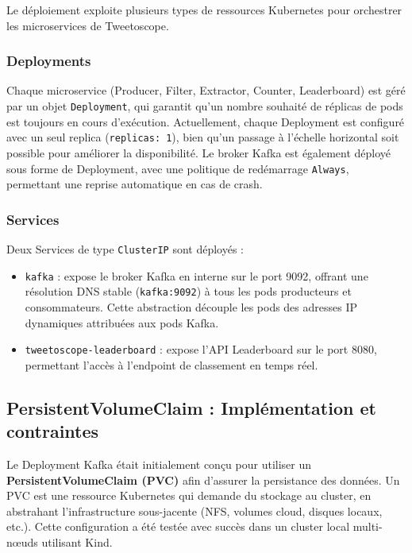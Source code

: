 \documentclass[10pt,a4paper]{article}
\begin{document}
Le déploiement exploite plusieurs types de ressources Kubernetes pour orchestrer les microservices de Tweetoscope.

\subsubsection{Deployments}

Chaque microservice (Producer, Filter, Extractor, Counter, Leaderboard) est géré par un objet \texttt{Deployment}, qui garantit qu’un nombre souhaité de réplicas de pods est toujours en cours d’exécution. Actuellement, chaque Deployment est configuré avec un seul replica (\texttt{replicas: 1}), bien qu’un passage à l’échelle horizontal soit possible pour améliorer la disponibilité. Le broker Kafka est également déployé sous forme de Deployment, avec une politique de redémarrage \texttt{Always}, permettant une reprise automatique en cas de crash.

\subsubsection{Services}

Deux Services de type \texttt{ClusterIP} sont déployés :

\begin{itemize}
    \item \texttt{kafka} : expose le broker Kafka en interne sur le port 9092, offrant une résolution DNS stable (\texttt{kafka:9092}) à tous les pods producteurs et consommateurs. Cette abstraction découple les pods des adresses IP dynamiques attribuées aux pods Kafka.
    \item \texttt{tweetoscope-leaderboard} : expose l’API Leaderboard sur le port 8080, permettant l’accès à l’endpoint de classement en temps réel.
\end{itemize}

\subsection{PersistentVolumeClaim : Implémentation et contraintes}

Le Deployment Kafka était initialement conçu pour utiliser un \textbf{PersistentVolumeClaim (PVC)} afin d’assurer la persistance des données. Un PVC est une ressource Kubernetes qui demande du stockage au cluster, en abstrahant l’infrastructure sous-jacente (NFS, volumes cloud, disques locaux, etc.). Cette configuration a été testée avec succès dans un cluster local multi-nœuds utilisant Kind.
\end{document}
